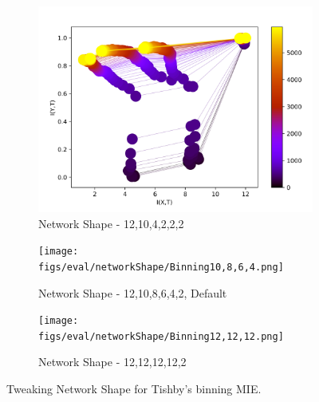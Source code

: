 \documentclass[dissertation.tex]{subfiles}
\begin{document}
\begin{figure}[ht]
  \centering
  \begin{subfigure}[t]{0.32\textwidth}
    \centering
    \includegraphics[width=\textwidth]{figs/eval/networkShape/Binning10,4,2,2.png}
    \caption{
      Network Shape - 12,10,4,2,2,2
    }
    \label{figNetworkShapeDefault}
  \end{subfigure}
  \hfill
  \begin{subfigure}[t]{0.32\textwidth}
    \centering
    \texttt{[image: figs/eval/networkShape/Binning10,8,6,4.png]}
    \caption{
      Network Shape - 12,10,8,6,4,2, Default
    }
    \label{figNetworkShape2}
  \end{subfigure}
  \hfill
  \begin{subfigure}[t]{0.32\textwidth}
    \centering
    \texttt{[image: figs/eval/networkShape/Binning12,12,12.png]}
    \caption{
      Network Shape - 12,12,12,12,2
    }
    \label{figNetworkShape3}
  \end{subfigure}
  \hfill
  \caption{
      Tweaking Network Shape for Tishby's binning MIE. 
    }
  \label{figNetworkShapes}
\end{figure}
\end{document}
